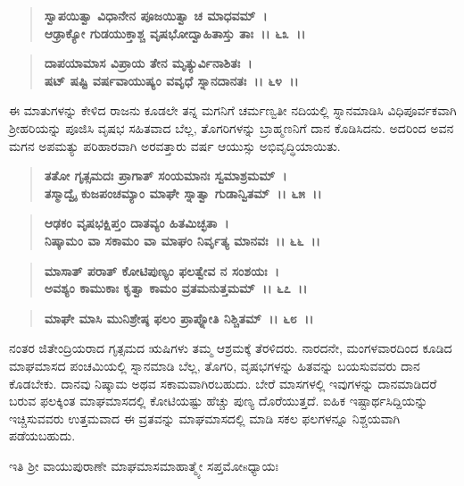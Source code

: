\begin{verse}
\textbf{ಸ್ವಾಪಯಿತ್ವಾ ವಿಧಾನೇನ ಪೂಜಯಿತ್ವಾ ಚ ಮಾಧವಮ್~।}\\\textbf{ಆಢ್ರಾಕ್ಯೋ ಗುಡಯುಕ್ತಾಶ್ಚ ವೃಷಭೋದ್ವಾಹಿತಾಸ್ತು ತಾಃ~।। ೬೩~।। }
\end{verse}

\begin{verse}
\textbf{ದಾಪಯಾಮಾಸ ವಿಪ್ರಾಯ ತೇನ ಮೃತ್ಯುರ್ವಿನಾಶಿತಃ~।}\\\textbf{ಷಟ್ ಷಷ್ಟಿ ವರ್ಷವಾಯುಷ್ಯಂ ವವೃಧೆ ಸ್ನಾನದಾನತಃ~।। ೬೪~।।}
\end{verse}

ಈ ಮಾತುಗಳನ್ನು ಕೇಳಿದ ರಾಜನು ಕೂಡಲೇ ತನ್ನ ಮಗನಿಗೆ ಚರ್ಮಣ್ವತೀ ನದಿಯಲ್ಲಿ ಸ್ನಾನಮಾಡಿಸಿ ವಿಧಿಪೂರ್ವಕವಾಗಿ ಶ‍್ರೀಹರಿಯನ್ನು ಪೂಜಿಸಿ ವೃಷಭ ಸಹಿತವಾದ ಬೆಲ್ಲ, ತೊಗರಿಗಳನ್ನು ಬ್ರಾಹ್ಮಣನಿಗೆ ದಾನ ಕೊಡಿಸಿದನು. ಅದರಿಂದ ಅವನ ಮಗನ ಅಪಮತ್ಯು ಪರಿಹಾರವಾಗಿ ಅರವತ್ತಾರು ವರ್ಷ ಆಯುಸ್ಸು ಅಭಿವೃದ್ಧಿಯಾಯಿತು.

\begin{verse}
\textbf{ತತೋ ಗೃತ್ಸಮದಃ ಪ್ರಾಗಾತ್ ಸಂಯಮಾನಃ ಸ್ವಮಾಶ್ರಮಮ್~।}\\\textbf{ತಸ್ಮಾದ್ವೈ ಕುಜಪಂಚಮ್ಯಾಂ ಮಾಘೇ ಸ್ನಾತ್ವಾ ಗುಡಾನ್ವಿತಮ್~।। ೬೫~।। }
\end{verse}

\begin{verse}
\textbf{ಆಢಕಂ ವೃಷಭಕ್ಷಿಪ್ತಂ ದಾತವ್ಯಂ ಹಿತಮಿಚ್ಛತಾ~।}\\\textbf{ನಿಷ್ಕಾಮಂ ವಾ ಸಕಾಮಂ ವಾ ಮಾಘಂ ನಿರ್ವೃತ್ಯ ಮಾನವಃ~।। ೬೬~।।} 
\end{verse}

\begin{verse}
\textbf{ಮಾಸಾತ್ ಪರಾತ್ ಕೋಟಿಪುಣ್ಯಂ ಫಲತ್ವೇವ ನ ಸಂಶಯಃ~।}\\\textbf{ಅವಶ್ಯಂ ಕಾಮುಕಾಃ ಕೃತ್ವಾ ಕಾಮಂ ವ್ರತಮನುತ್ತಮಮ್~।। ೬೭~।।} 
\end{verse}

\begin{verse}
\textbf{ಮಾಘೇ ಮಾಸಿ ಮುನಿಶ್ರೇಷ್ಠ ಫಲಂ ಪ್ರಾಪ್ನೋತಿ ನಿಶ್ಚಿತಮ್~।। ೬೮~।।}
\end{verse}

ನಂತರ ಜಿತೇಂದ್ರಿಯರಾದ ಗೃತ್ಸಮದ ಋಷಿಗಳು ತಮ್ಮ ಆಶ್ರಮಕ್ಕೆ ತೆರಳಿದರು. ನಾರದನೇ, ಮಂಗಳವಾರದಿಂದ ಕೂಡಿದ ಮಾಘಮಾಸದ ಪಂಚಮಿಯಲ್ಲಿ ಸ್ನಾನಮಾಡಿ ಬೆಲ್ಲ, ತೊಗರಿ, ವೃಷಭಗಳನ್ನು ಹಿತವನ್ನು ಬಯಸುವವರು ದಾನ ಕೊಡಬೇಕು. ದಾನವು ನಿಷ್ಕಾಮ ಅಥವ ಸಕಾಮವಾಗಿರಬಹುದು. ಬೇರೆ ಮಾಸಗಳಲ್ಲಿ ಇವುಗಳನ್ನು ದಾನಮಾಡಿದರೆ ಬರುವ ಫಲಕ್ಕಿಂತ ಮಾಘಮಾಸದಲ್ಲಿ ಕೋಟಿಯಷ್ಟು ಹೆಚ್ಚು ಪುಣ್ಯ ದೊರೆಯುತ್ತದೆ. ಐಹಿಕ ಇಷ್ಟಾರ್ಥಸಿದ್ದಿಯನ್ನು ಇಚ್ಚಿಸುವವರು ಉತ್ತಮವಾದ ಈ ವ್ರತವನ್ನು ಮಾಘಮಾಸದಲ್ಲಿ ಮಾಡಿ ಸಕಲ ಫಲಗಳನ್ನೂ ನಿಶ್ಚಯವಾಗಿ ಪಡೆಯಬಹುದು.

\begin{center}
ಇತಿ ಶ‍್ರೀ ವಾಯುಪುರಾಣೇ ಮಾಘಮಾಸಮಾಹಾತ್ಮ್ಯೇ ಸಪ್ತಮೋsಧ್ಯಾಯಃ 
\end{center}

